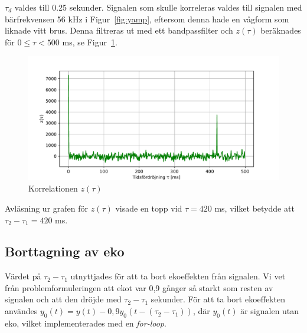 \documentclass[10pt,twocolumn]{article}
\begin{document}
$\tau_d$ valdes till 0.25 sekunder. Signalen som skulle korreleras valdes till
signalen med bärfrekvensen 56 kHz i Figur~\ref{fig:yamp}, eftersom denna hade
en vågform som liknade vitt brus. Denna filtreras ut med ett bandpassfilter och
$z(\tau)$ beräknades för $0 \leq \tau < 500$ ms, se Figur~\ref{fig:corr}.

\begin{figure}[h]
    \centering
    \includegraphics[width=\linewidth]{figures/corr.pdf}
    \caption{Korrelationen $z(\tau)$}\label{fig:corr}
\end{figure}

Avläsning ur grafen för $z(\tau)$ visade en topp vid $\tau = 420$ ms, vilket
betydde att $\tau_2 - \tau_1 = 420$ ms.

\subsection{Borttagning av eko}\label{sub:echo}
Värdet på $\tau_2 - \tau_1$ utnyttjades för att ta bort ekoeffekten från signalen. Vi
vet från problemformuleringen att ekot var 0,9 gånger så starkt som resten av signalen 
och att den dröjde med $\tau_2 - \tau_1$ sekunder. För att ta bort ekoeffekten
användes $y_0(t) = y(t) - 0,9y_0(t - (\tau_2 - \tau_1))$, där $y_0(t)$ är signalen
utan eko, vilket implementerades med en \textit{for-loop}.

\end{document}
